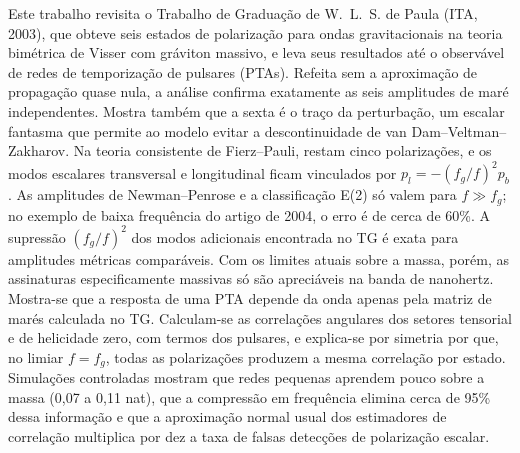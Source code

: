 Este trabalho revisita o Trabalho de Graduação de W.~L.~S. de Paula
(ITA, 2003), que obteve seis estados de polarização para ondas
gravitacionais na teoria bimétrica de Visser com gráviton massivo, e
leva seus resultados até o observável de redes de temporização de
pulsares (PTAs). Refeita sem a aproximação de propagação quase nula, a
análise confirma exatamente as seis amplitudes de maré independentes.
Mostra também que a sexta é o traço da perturbação, um escalar fantasma
que permite ao modelo evitar a descontinuidade de van
Dam--Veltman--Zakharov. Na teoria consistente de Fierz--Pauli, restam
cinco polarizações, e os modos escalares transversal e longitudinal ficam
vinculados por $p_l=-(f_g/f)^2p_b$. As amplitudes de Newman--Penrose e a
classificação E(2) só valem para $f\gg f_g$; no exemplo de baixa
frequência do artigo de 2004, o erro é de cerca de 60\%. A supressão
$(f_g/f)^2$ dos modos adicionais encontrada no TG é exata para
amplitudes métricas comparáveis. Com os limites atuais sobre a massa,
porém, as assinaturas especificamente massivas só são apreciáveis na
banda de nanohertz. Mostra-se que a resposta de uma PTA depende da onda
apenas pela matriz de marés calculada no TG. Calculam-se as correlações
angulares dos setores tensorial e de helicidade zero, com termos dos
pulsares, e explica-se por simetria por que, no limiar $f=f_g$, todas as
polarizações produzem a mesma correlação por estado. Simulações
controladas mostram que redes pequenas aprendem pouco sobre a massa
(0,07 a 0,11 nat), que a compressão em frequência elimina cerca de 95\%
dessa informação e que a aproximação normal usual dos estimadores de
correlação multiplica por dez a taxa de falsas detecções de polarização
escalar.
